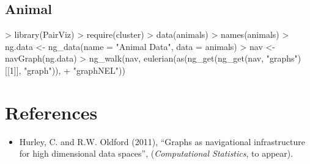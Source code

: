 \documentclass[12pt,oneside,titlepage,letter]{article}
\begin{document}
\subsection{Animal}
\begin{Schunk}
\begin{Sinput}
> library(PairViz)
> require(cluster)
> data(animals)
> names(animals)
> ng.data <- ng_data(name = "Animal Data", data = animals)
> nav <- navGraph(ng.data)
> ng_walk(nav, eulerian(as(ng_get(ng_get(nav, "graphs")[[1]], "graph")), 
+     "graphNEL"))
\end{Sinput}
\end{Schunk}


\section*{References}

\begin{itemize}

\item Hurley, C. and R.W. Oldford (2011), 
 ``Graphs as navigational infrastructure for high dimensional data spaces'',  ({\it Computational Statistics}, to appear).


\end{itemize}
\end{document}
